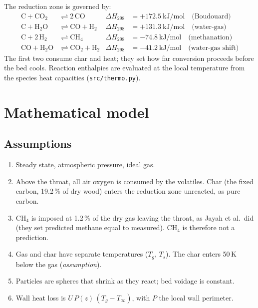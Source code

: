 \documentclass[11pt,a4paper]{article}
\begin{document}
The reduction zone is governed by:
\begin{align}
\text{C} + \text{CO}_2 &\rightleftharpoons 2\,\text{CO} & \Delta H_{298} &= +172.5~\text{kJ/mol} \quad\text{(Boudouard)}\\
\text{C} + \text{H}_2\text{O} &\rightleftharpoons \text{CO} + \text{H}_2 & \Delta H_{298} &= +131.3~\text{kJ/mol} \quad\text{(water-gas)}\\
\text{C} + 2\,\text{H}_2 &\rightleftharpoons \text{CH}_4 & \Delta H_{298} &= -74.8~\text{kJ/mol} \quad\text{(methanation)}\\
\text{CO} + \text{H}_2\text{O} &\rightleftharpoons \text{CO}_2 + \text{H}_2 & \Delta H_{298} &= -41.2~\text{kJ/mol} \quad\text{(water-gas shift)}
\end{align}
The first two consume char and heat; they set how far conversion proceeds before the bed cools. Reaction enthalpies are evaluated at the local temperature from the species heat capacities (\texttt{src/thermo.py}).

\section{Mathematical model}
\subsection{Assumptions}
\begin{enumerate}
\item Steady state, atmospheric pressure, ideal gas.
\item Above the throat, all air oxygen is consumed by the volatiles. Char (the fixed carbon, 19.2\,\% of dry wood) enters the reduction zone unreacted, as pure carbon.
\item CH$_4$ is imposed at 1.2\,\% of the dry gas leaving the throat, as Jayah et al.\ did (they set predicted methane equal to measured). CH$_4$ is therefore not a prediction.
\item Gas and char have separate temperatures ($T_g$, $T_s$). The char enters 50\,K below the gas (\emph{assumption}).
\item Particles are spheres that shrink as they react; bed voidage is constant.
\item Wall heat loss is $U\,P(z)\,(T_g-T_\infty)$, with $P$ the local wall perimeter.
\end{enumerate}
\end{document}
